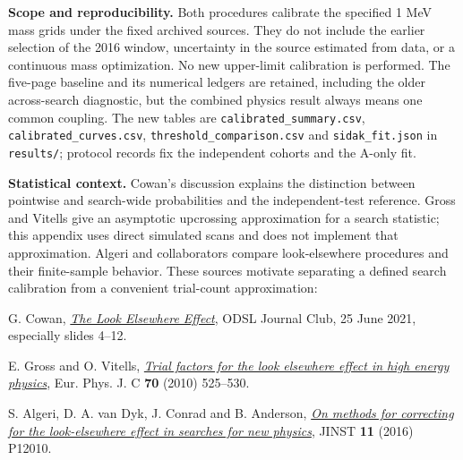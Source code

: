 \documentclass[11pt]{article}
\begin{document}
\textbf{Scope and reproducibility.} Both procedures calibrate the specified 1 MeV mass grids under the fixed archived sources. They do not include the earlier selection of the 2016 window, uncertainty in the source estimated from data, or a continuous mass optimization. No new upper-limit calibration is performed. The five-page baseline and its numerical ledgers are retained, including the older across-search diagnostic, but the combined physics result always means one common coupling. The new tables are \texttt{calibrated\_summary.csv}, \texttt{calibrated\_curves.csv}, \texttt{threshold\_comparison.csv} and \texttt{sidak\_fit.json} in \texttt{results/}; protocol records fix the independent cohorts and the A-only fit.

\textbf{Statistical context.} Cowan's discussion explains the distinction between pointwise and search-wide probabilities and the independent-test reference. Gross and Vitells give an asymptotic upcrossing approximation for a search statistic; this appendix uses direct simulated scans and does not implement that approximation. Algeri and collaborators compare look-elsewhere procedures and their finite-sample behavior. These sources motivate separating a defined search calibration from a convenient trial-count approximation:

{\small
G. Cowan, \href{https://www.pp.rhul.ac.uk/~cowan/stat/cowan_lee_25jun21.pdf}{\emph{The Look Elsewhere Effect}}, ODSL Journal Club, 25 June 2021, especially slides 4--12.\par
E. Gross and O. Vitells, \href{https://arxiv.org/abs/1005.1891}{\emph{Trial factors for the look elsewhere effect in high energy physics}}, Eur. Phys. J. C \textbf{70} (2010) 525--530.\par
S. Algeri, D. A. van Dyk, J. Conrad and B. Anderson, \href{https://arxiv.org/abs/1602.03765}{\emph{On methods for correcting for the look-elsewhere effect in searches for new physics}}, JINST \textbf{11} (2016) P12010.\par}
\end{document}
